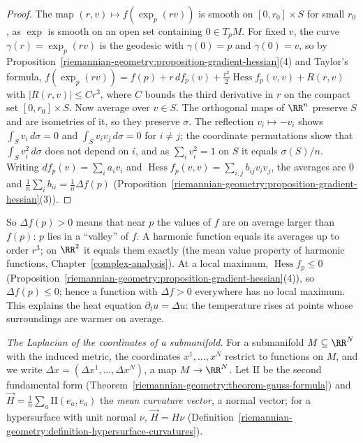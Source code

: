 \begin{proof}
The map $(r, v) \mapsto f(\exp_p(rv))$ is smooth on $[0, r_0] \times S$ for small $r_0$, as $\exp$ is smooth on an open set containing $0 \in T_pM$. For fixed $v$, the curve
$\gamma(r) = \exp_p(rv)$ is the geodesic with $\gamma(0) = p$ and $\dot\gamma(0) = v$, so by Proposition~\ref{riemannian-geometry:proposition-gradient-hessian}(4) and Taylor's formula,
$f(\exp_p(rv)) = f(p) + r\,df_p(v) + \frac{r^2}2\operatorname{Hess}f_p(v, v) + R(r, v)$ with $|R(r, v)| \leq Cr^3$, where $C$ bounds the third derivative in $r$ on the compact set
$[0, r_0] \times S$. Now average over $v \in S$. The orthogonal maps of $\RR^n$ preserve $S$ and are isometries of it, so they preserve $\sigma$. The reflection
$v_i \mapsto -v_i$ shows $\int_Sv_i\,d\sigma = 0$ and $\int_Sv_iv_j\,d\sigma = 0$ for $i \neq j$; the coordinate permutations show that $\int_Sv_i^2\,d\sigma$ does not depend on $i$, and as
$\sum_iv_i^2 = 1$ on $S$ it equals $\sigma(S)/n$. Writing $df_p(v) = \sum_ia_iv_i$ and $\operatorname{Hess}f_p(v, v) = \sum_{i,j}b_{ij}v_iv_j$, the averages are $0$ and
$\frac1n\sum_ib_{ii} = \frac1n\Delta f(p)$ (Proposition~\ref{riemannian-geometry:proposition-gradient-hessian}(3)).
\end{proof}

So $\Delta f(p) > 0$ means that near $p$ the values of $f$ are on average larger than $f(p)$: $p$ lies in a ``valley'' of $f$. A harmonic function equals its averages up to order
$r^3$; on $\RR^2$ it equals them exactly (the mean value property of harmonic functions, Chapter~\ref{complex-analysis}). At a local maximum, $\operatorname{Hess}f_p \leq 0$ (Proposition~\ref{riemannian-geometry:proposition-gradient-hessian}(4)),
so $\Delta f(p) \leq 0$; hence a function with $\Delta f > 0$ everywhere has no local maximum. This explains the heat equation $\partial_tu = \Delta u$: the temperature rises at points
whose surroundings are warmer on average.

\emph{The Laplacian of the coordinates of a submanifold.} For a submanifold $M \subseteq \RR^N$ with the induced metric, the coordinates $x^1, \ldots, x^N$ restrict to functions on $M$,
and we write $\Delta x = (\Delta x^1, \ldots, \Delta x^N)$, a map $M \to \RR^N$. Let $\mathrm{II}$ be the second fundamental form (Theorem~\ref{riemannian-geometry:theorem-gauss-formula}) and
$\vec{H} = \frac1n\sum_a\mathrm{II}(e_a, e_a)$ the \emph{mean curvature vector}, a normal vector; for a hypersurface with unit normal $\nu$, $\vec{H} = H\nu$
(Definition~\ref{riemannian-geometry:definition-hypersurface-curvatures}).

